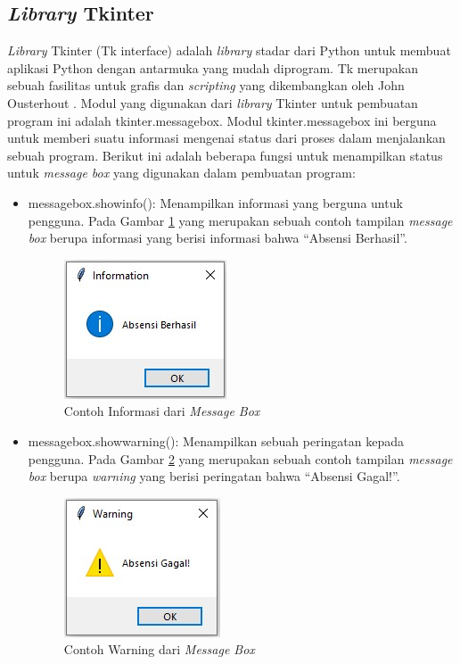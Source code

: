 \subsection{\textit{Library} Tkinter}
\textit{Library} Tkinter (Tk interface) adalah \textit{library} stadar dari Python untuk membuat aplikasi Python dengan antarmuka yang mudah diprogram. Tk merupakan sebuah fasilitas untuk grafis dan \textit{scripting} yang dikembangkan oleh John Ousterhout {\cite{tkinter}}. Modul yang digunakan dari \textit{library} Tkinter untuk pembuatan program ini adalah tkinter.messagebox. Modul tkinter.messagebox ini berguna untuk memberi suatu informasi mengenai status dari proses dalam menjalankan sebuah program. Berikut ini adalah beberapa fungsi untuk menampilkan status untuk \textit{message box} yang digunakan dalam pembuatan program:
\begin{itemize}
	\item messagebox.showinfo(): Menampilkan informasi yang berguna untuk pengguna. Pada Gambar \ref{fig:infoBox} yang merupakan sebuah contoh tampilan \textit{message box} berupa informasi yang berisi informasi bahwa ``Absensi Berhasil''. 
	\begin{figure}[H]
		\centering
		\includegraphics[scale=0.9]{Gambar/infoBox.jpg}
		\caption{Contoh Informasi dari \textit{Message Box}} 
		\label{fig:infoBox}
	\end{figure}
	\item messagebox.showwarning(): Menampilkan sebuah peringatan kepada pengguna.  Pada Gambar \ref{fig:warningBox} yang merupakan sebuah contoh tampilan \textit{message box} berupa \textit{warning} yang berisi peringatan bahwa ``Absensi Gagal!''. 
	\begin{figure}[H]
		\centering
		\includegraphics[scale=0.9]{Gambar/warningBox.jpg}
		\caption{Contoh Warning dari \textit{Message Box}} 
		\label{fig:warningBox}
	\end{figure}
\end{itemize}

